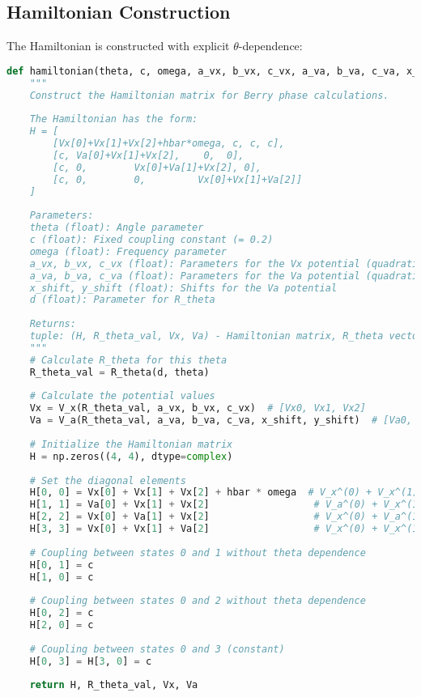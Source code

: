 \documentclass[12pt,a4paper]{article}
\begin{document}
\subsection{Hamiltonian Construction}

The Hamiltonian is constructed with explicit $\theta$-dependence:

\begin{lstlisting}[language=Python, caption=Hamiltonian construction]
def hamiltonian(theta, c, omega, a_vx, b_vx, c_vx, a_va, b_va, c_va, x_shift, y_shift, d):
    """
    Construct the Hamiltonian matrix for Berry phase calculations.
    
    The Hamiltonian has the form:
    H = [
        [Vx[0]+Vx[1]+Vx[2]+hbar*omega, c, c, c],
        [c, Va[0]+Vx[1]+Vx[2],    0,  0],
        [c, 0,        Vx[0]+Va[1]+Vx[2], 0],
        [c, 0,        0,         Vx[0]+Vx[1]+Va[2]]
    ]
    
    Parameters:
    theta (float): Angle parameter
    c (float): Fixed coupling constant (= 0.2)
    omega (float): Frequency parameter
    a_vx, b_vx, c_vx (float): Parameters for the Vx potential (quadratic, linear, constant terms)
    a_va, b_va, c_va (float): Parameters for the Va potential (quadratic, linear, constant terms)
    x_shift, y_shift (float): Shifts for the Va potential
    d (float): Parameter for R_theta
    
    Returns:
    tuple: (H, R_theta_val, Vx, Va) - Hamiltonian matrix, R_theta vector, Vx and Va values
    """
    # Calculate R_theta for this theta
    R_theta_val = R_theta(d, theta)
    
    # Calculate the potential values
    Vx = V_x(R_theta_val, a_vx, b_vx, c_vx)  # [Vx0, Vx1, Vx2]
    Va = V_a(R_theta_val, a_va, b_va, c_va, x_shift, y_shift)  # [Va0, Va1, Va2]
    
    # Initialize the Hamiltonian matrix
    H = np.zeros((4, 4), dtype=complex)
    
    # Set the diagonal elements
    H[0, 0] = Vx[0] + Vx[1] + Vx[2] + hbar * omega  # V_x^(0) + V_x^(1) + V_x^(2) + hbar*omega
    H[1, 1] = Va[0] + Vx[1] + Vx[2]                  # V_a^(0) + V_x^(1) + V_x^(2)
    H[2, 2] = Vx[0] + Va[1] + Vx[2]                  # V_x^(0) + V_a^(1) + V_x^(2)
    H[3, 3] = Vx[0] + Vx[1] + Va[2]                  # V_x^(0) + V_x^(1) + V_a^(2)
    
    # Coupling between states 0 and 1 without theta dependence
    H[0, 1] = c 
    H[1, 0] = c 
    
    # Coupling between states 0 and 2 without theta dependence
    H[0, 2] = c 
    H[2, 0] = c
    
    # Coupling between states 0 and 3 (constant)
    H[0, 3] = H[3, 0] = c
    
    return H, R_theta_val, Vx, Va
\end{lstlisting}
\end{document}
